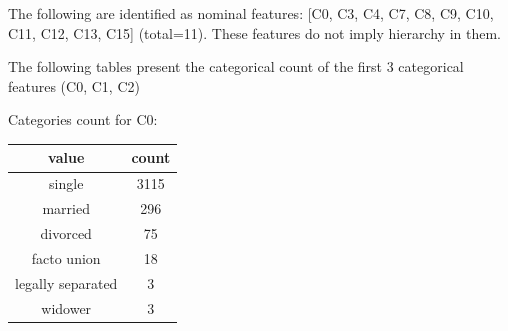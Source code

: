 \documentclass{article}
\begin{document}
\begin{description}
\begin{itemize}
				The following are identified as nominal features: [C0, C3, C4, C7, C8, C9, C10, C11, C12, C13, C15] (total=11). These features do not imply hierarchy in them.

				The following tables present the categorical count of the first 3 categorical features (C0, C1, C2)

				Categories count for C0:
				\begin{center}
					\begin{tabular}{|c|c|}
						\hline
						value & count \\
						\hline
						single               &3115 \\
						married              & 296 \\
						divorced             &  75 \\
						facto union          &  18 \\
						legally separated    &   3 \\
						widower              &   3 \\
						\hline
					\end{tabular}
				\end{center}


\end{itemize}
\end{description}
\end{document}
